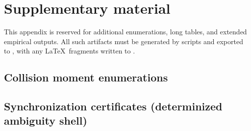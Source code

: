 \section{Supplementary material}\label{app:supplementary}

This appendix is reserved for additional enumerations, long tables, and extended empirical outputs.
All such artifacts must be generated by scripts and exported to , with any \LaTeX\ fragments written to .

\subsection{Collision moment enumerations}\label{subsec:supp-collision-moments}

\subsection{Synchronization certificates (determinized ambiguity shell)}\label{subsec:supp-sync-theory}

